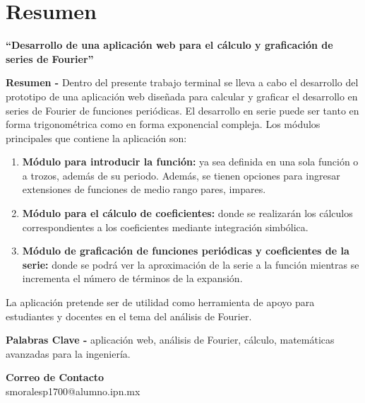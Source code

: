 \chapter{Resumen}
\begin{center}
	\textbf{\Large “Desarrollo de una aplicación web para el cálculo y graficación de series de Fourier”}
	\vspace{0.5cm}
\end{center}

\textbf{Resumen -} Dentro del presente trabajo terminal se lleva a cabo el desarrollo del prototipo de una aplicación web diseñada para calcular y graficar el desarrollo en series de Fourier de funciones periódicas. El desarrollo en serie puede ser tanto en forma trigonométrica como en forma exponencial compleja. Los módulos principales que contiene la aplicación son:

\begin{enumerate}
	\item \textbf{Módulo para introducir la función:} ya sea definida en una sola función o a trozos, además de su periodo. Además, se tienen opciones para ingresar extensiones de funciones de medio rango pares, impares.
	\item \textbf{Módulo para el cálculo de coeficientes:} donde se realizarán los cálculos correspondientes a los coeficientes mediante integración simbólica.
	\item \textbf{Módulo de graficación de funciones periódicas y coeficientes de la serie:} donde se podrá ver la aproximación de la serie a la función mientras se incrementa el número de términos de la expansión.
\end{enumerate}

 La aplicación pretende ser de utilidad como herramienta de apoyo para estudiantes y docentes en el tema del análisis de Fourier.

\vspace{0.5cm}

\textbf{Palabras Clave -} aplicación web, análisis de Fourier, cálculo, matemáticas avanzadas para la ingeniería.

\vspace{0.5cm}

\textbf{Correo de Contacto} \\
smoralesp1700@alumno.ipn.mx \\